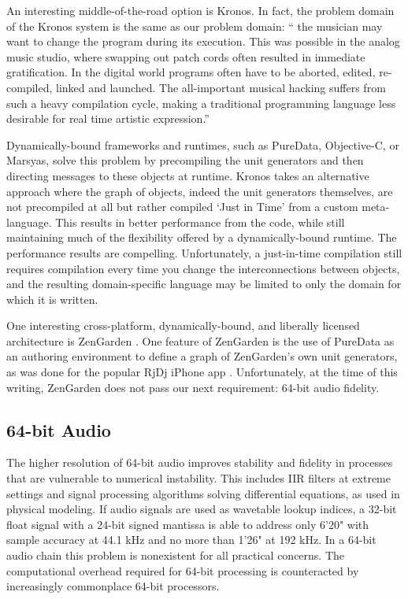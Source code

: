 \documentclass[twoside,10pt]{article}
\begin{document}

An interesting middle-of-the-road option is Kronos.  In fact, the problem domain of the Kronos system is the same as our problem domain: `` the musician may want to change the program during its execution. This was possible in the analog music studio, where swapping out patch cords often resulted in immediate gratification. In the digital world programs often have to be aborted, edited, re-compiled, linked and launched. The all-important musical hacking suffers from such a heavy compilation cycle, making a traditional programming language less desirable for real time artistic expression.'' \cite{Norilo:2009}

Dynamically-bound frameworks and runtimes, such as PureData, Objective-C, or Marsyas, solve this problem by precompiling the unit generators and then directing messages to these objects at runtime.  Kronos takes an alternative approach where the graph of objects, indeed the unit generators themselves, are not precompiled at all but rather compiled `Just in Time' from a custom meta-language. This results in better performance from the code, while still maintaining much of the flexibility offered by a dynamically-bound runtime.  The performance results are compelling.  Unfortunately, a just-in-time compilation still requires compilation every time you change the interconnections between objects, and the resulting domain-specific language may be limited to only the domain for which it is written.

One interesting cross-platform, dynamically-bound, and liberally licensed architecture is ZenGarden \cite{web4}.  One feature of ZenGarden is the use of PureData as an authoring environment to define a graph of ZenGarden's own unit generators, as was done for the popular RjDj iPhone app \cite{web5}.  Unfortunately, at the time of this writing, ZenGarden does not pass our next requirement: 64-bit audio fidelity.



\subsection{64-bit Audio} %

The higher resolution of 64-bit audio improves stability and fidelity in processes that are vulnerable to numerical instability.  This includes IIR filters at extreme settings and signal processing algorithms solving differential equations, as used in physical modeling.  If audio signals are used as wavetable lookup indices, a 32-bit float signal with a 24-bit signed mantissa is able to address only 6'20" with sample accuracy at 44.1 kHz and no more than 1'26" at 192 kHz. In a 64-bit audio chain this problem is nonexistent for all practical concerns. The computational overhead required for 64-bit processing is counteracted by increasingly commonplace 64-bit processors.
\end{document}
